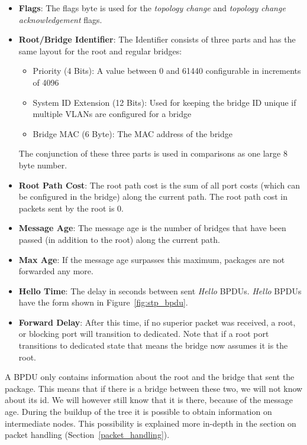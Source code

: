 \begin{itemize}
    \item \textbf{Flags}: The flags byte is used for the \textit{topology change} and \textit{topology change acknowledgement} flags.
    \item \textbf{Root/Bridge Identifier}: The Identifier consists of three parts and has the same layout for the root and regular bridges:
        \begin{itemize}
            \item Priority (4 Bits): A value between 0 and 61440 configurable in increments of 4096
            \item System ID Extension (12 Bits): Used for keeping the bridge ID unique if multiple VLANs are configured for a bridge
            \item Bridge MAC (6 Byte): The MAC address of the bridge
        \end{itemize}
        The conjunction of these three parts is used in comparisons as one large 8 byte number.
    \item \textbf{Root Path Cost}: The root path cost is the sum of all port costs (which can be configured in the bridge) along the current path. The root path cost in packets sent by the root is 0.
    \item \textbf{Message Age}: The message age is the number of bridges that have been passed (in addition to the root) along the current path.
    \item \textbf{Max Age}: If the message age surpasses this maximum, packages are not forwarded any more.
    \item \textbf{Hello Time}: The delay in seconds between sent \textit{Hello} BPDUs.
        \textit{Hello} BPDUs have the form shown in Figure~\ref{fig:stp_bpdu}.
    \item \textbf{Forward Delay}: After this time, if no superior packet was received, a root, or blocking port will transition to dedicated.
        Note that if a root port transitions to dedicated state that means the bridge now assumes it is the root.
\end{itemize}
A BPDU only contains information about the root and the bridge that sent the package.
This means that if there is a bridge between these two, we will not know about its id.
We will however still know that it is there, because of the message age.
During the buildup of the tree it is possible to obtain information on intermediate nodes.
This possibility is explained more in-depth in the section on packet handling (Section~\ref{packet_handling}).


